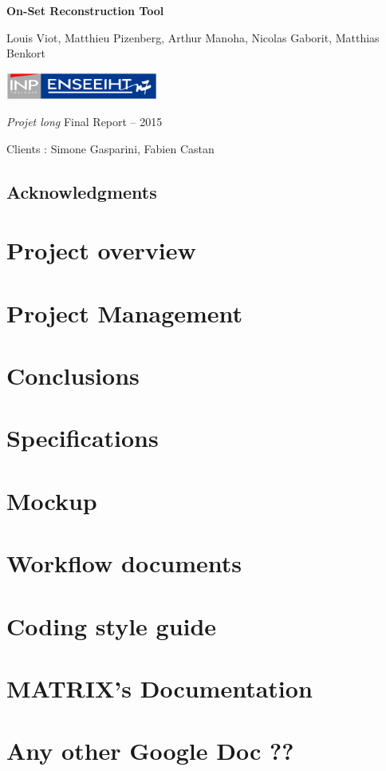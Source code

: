 \documentclass[a4paper]{report}
\title{\mytitle}
\author{\myauthor}
\date{From January, 19\up{th} to March, 13\up{th}}
\def\mytitle{On-Set Reconstruction Tool}
\def\myauthor{Louis Viot, Matthieu Pizenberg, Arthur Manoha, Nicolas
  Gaborit, Matthias Benkort}
\begin{document}
\begin{titlepage}
\centering

\null
\vfill

{\Huge\sffamily\bfseries\mytitle\par}
\vspace{1cm}
{\Large\myauthor\par}

\vfill
\vfill

\includegraphics[width=5cm]{img/inpn7.pdf}

\vfill

{\Large \emph{Projet long} Final Report -- 2015\par%
  Clients : Simone Gasparini, Fabien Castan\par}


\end{titlepage}

\newpage

\thispagestyle{empty}
\null
\vfill

\section*{Acknowledgments}


\chapter{Project overview}


\chapter{Project Management}


\chapter{Conclusions}


\appendix
\chapter{Specifications}
\chapter{Mockup}
\chapter{Workflow documents}
\chapter{Coding style guide}
\chapter{MATRIX's Documentation}
\chapter{Any other Google Doc ??}
\end{document}
